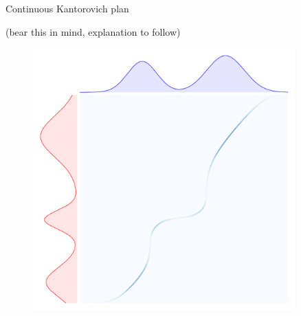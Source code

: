 \documentclass[pdf,aspectratio=169,10pt]{beamer}
\begin{document}
\begin{frame}{ Continuous Kantorovich plan}
\begin{minipage}{0.59\textwidth}
        (bear this in mind, explanation to follow)
\end{minipage} 
\hfill
\begin{minipage}{0.4\textwidth}
\begin{figure}
    \centering
        \includegraphics[width=0.9\textwidth]{../img/kantorovich_continuous_solution.pdf}
    \end{figure}
    \centering
    \small
{}
\end{minipage}
\end{frame}
\end{document}
